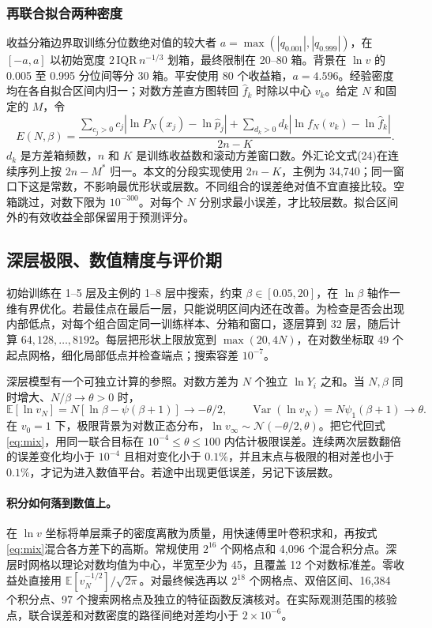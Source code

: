 \documentclass[11pt,a4paper]{article}
\begin{document}
\subsubsection{再联合拟合两种密度}
收益分箱边界取训练分位数绝对值的较大者 $a=\max(|q_{0.001}|,|q_{0.999}|)$，在 $[-a,a]$ 以初始宽度 $2\,\mathrm{IQR}\,n^{-1/3}$ 划箱，最终限制在 20--80 箱。背景在 $\ln v$ 的 0.005 至 0.995 分位间等分 30 箱。平安使用 80 个收益箱，$a=4.596$。经验密度均在各自拟合区间内归一；对数方差直方图转回 $\widehat f_k$ 时除以中心 $v_k$。给定 $N$ 和固定的 $M$，令
\begin{equation}
 E(N,\beta)=\frac{\sum_{c_j>0}c_j\left|\ln P_N(x_j)-\ln\widehat p_j\right|
 +\sum_{d_k>0}d_k\left|\ln f_N(v_k)-\ln\widehat f_k\right|}{2n-K}.\label{eq:loss}
\end{equation}
$d_k$ 是方差箱频数，$n$ 和 $K$ 是训练收益数和滚动方差窗口数。外汇论文式(24)在连续序列上按 $2n-M^*$ 归一。本文的分段实现使用 $2n-K$，主例为 34,740；同一窗口下这是常数，不影响最优形状或层数。不同组合的误差绝对值不宜直接比较。空箱跳过，对数下限为 $10^{-300}$。对每个 $N$ 分别求最小误差，才比较层数。拟合区间外的有效收益全部保留用于预测评分。

\clearpage
\subsection{深层极限、数值精度与评价期}\label{sec:oos_method}
初始训练在 1--5 层及主例的 1--8 层中搜索，约束 $\beta\in[0.05,20]$，在 $\ln\beta$ 轴作一维有界优化。若最佳点在最后一层，只能说明区间内还在改善。为检查是否会出现内部低点，对每个组合固定同一训练样本、分箱和窗口，逐层算到 32 层，随后计算 $64,128,\ldots,8192$。每层把形状上限放宽到 $\max(20,4N)$，在对数坐标取 49 个起点网格，细化局部低点并检查端点；搜索容差 $10^{-7}$。

深层模型有一个可独立计算的参照。对数方差为 $N$ 个独立 $\ln Y_i$ 之和。当 $N,\beta$ 同时增大、$N/\beta\to\theta>0$ 时，
\[
 \mathbb E[\ln v_N]=N[\ln\beta-\psi(\beta+1)]\longrightarrow-\theta/2,\qquad
 \operatorname{Var}(\ln v_N)=N\psi_1(\beta+1)\longrightarrow\theta.
\]
在 $v_0=1$ 下，极限背景为对数正态分布，$\ln v_\infty\sim\mathcal N(-\theta/2,\theta)$。把它代回式\eqref{eq:mix}，用同一联合目标在 $10^{-4}\leq\theta\leq100$ 内估计极限误差。连续两次层数翻倍的误差变化均小于 $10^{-4}$ 且相对变化小于 $0.1\%$，并且末点与极限的相对差也小于 $0.1\%$，才记为进入数值平台。若途中出现更低误差，另记下该层数。

\paragraph{积分如何落到数值上。}
在 $\ln v$ 坐标将单层乘子的密度离散为质量，用快速傅里叶卷积求和，再按式\eqref{eq:mix}混合各方差下的高斯。常规使用 $2^{16}$ 个网格点和 4,096 个混合积分点。深层时网格以理论对数均值为中心，半宽至少为 45，且覆盖 12 个对数标准差。零收益处直接用 $\mathbb E[v_N^{-1/2}]/\sqrt{2\pi}$。对最终候选再以 $2^{18}$ 个网格点、双倍区间、16,384 个积分点、97 个搜索网格点及独立的特征函数反演核对。在实际观测范围的核验点，联合误差和对数密度的路径间绝对差均小于 $2\times10^{-6}$。
\end{document}
